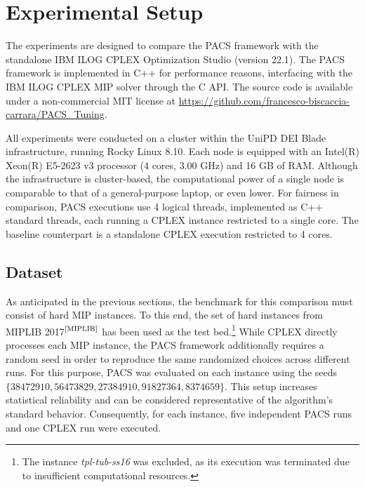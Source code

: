 \section{Experimental Setup}
The experiments are designed to compare the PACS framework with the standalone IBM ILOG CPLEX Optimization Studio (version 22.1).  
The PACS framework is implemented in C++ for performance reasons, interfacing with the IBM ILOG CPLEX MIP solver through the C API. The source code is available under a non-commercial MIT license at \url{https://github.com/francesco-biscaccia-carrara/PACS_Tuning}. 

All experiments were conducted on a cluster within the UniPD DEI Blade infrastructure, running Rocky Linux 8.10. Each node is equipped with an Intel(R) Xeon(R) E5-2623 v3 processor (4 cores, 3.00 GHz) and 16 GB of RAM. Although the infrastructure is cluster-based, the computational power of a single node is comparable to that of a general-purpose laptop, or even lower.  
For fairness in comparison, PACS executions use 4 logical threads, implemented as C++ standard threads, each running a CPLEX instance restricted to a single core. The baseline counterpart is a standalone CPLEX execution restricted to 4 cores.

\subsection{Dataset}
As anticipated in the previous sections, the benchmark for this comparison must consist of hard MIP instances. To this end, the set of hard instances from MIPLIB 2017$^\text{\cite{MIPLIB}}$ has been used as the test bed.\footnote{The instance \textit{tpl-tub-ss16} was excluded, as its execution was terminated due to insufficient computational resources.}  
While CPLEX directly processes each MIP instance, the PACS framework additionally requires a random seed in order to reproduce the same randomized choices across different runs. For this purpose, PACS was evaluated on each instance using the seeds $\{38472910, 56473829, 27384910, 91827364, 8374659\}$. This setup increases statistical reliability and can be considered representative of the algorithm’s standard behavior.  
Consequently, for each instance, five independent PACS runs and one CPLEX run were executed.

